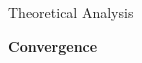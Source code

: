 \documentclass[final]{beamer}
\newlength{\onecolwid}
\newlength{\twocolwid}
\begin{document}
\begin{frame}[t]
\begin{columns}[t]
\begin{column}{\onecolwid}















\begin{block}{Theoretical Analysis}

\textbf{Convergence}


\end{block}
\end{column}
\end{columns}
\end{frame}
\end{document}
